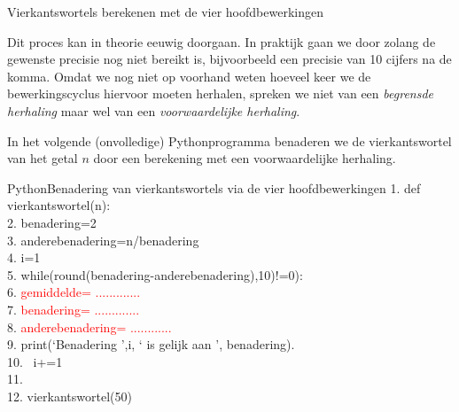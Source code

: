 \begin{lesactiviteit}{Vierkantswortels berekenen met de vier hoofdbewerkingen}
     \begin{vraagenantwoord}[resume]
    \end{vraagenantwoord}
    
    Dit proces kan in theorie eeuwig doorgaan. In praktijk gaan we door zolang de gewenste precisie nog niet bereikt is, bijvoorbeeld een precisie van 10 cijfers na de komma. Omdat we nog niet op voorhand weten hoeveel keer we de bewerkingscyclus hiervoor moeten herhalen, spreken we niet van een \emph{begrensde herhaling} maar wel van een \emph{voorwaardelijke herhaling}. 
    
    In het volgende (onvolledige) Pythonprogramma benaderen we de vierkantswortel van het getal $n$ door een berekening met een voorwaardelijke herhaling.\\
    
    \medskip
    
    \begin{kader}{Python}{Benadering van vierkantswortels via de vier hoofdbewerkingen}
    1. \qquad  def vierkantswortel(n):\\
    2. \qquad \qquad benadering=2\\
    3. \qquad \qquad anderebenadering=n/benadering\\
    4. \qquad \qquad i=1\\
    5. \qquad \qquad while(round(benadering-anderebenadering),10)!=0):\\
    6. \qquad \qquad \qquad \textcolor{red} {gemiddelde= .............}\\
    7. \qquad \qquad \qquad \textcolor{red} {benadering= .............}\\
    8. \qquad \qquad \qquad \textcolor{red} {anderebenadering= ............}\\
    9. \qquad \qquad \qquad print(`Benadering ',i, ` is gelijk aan ', benadering).\\
    10. \qquad \qquad \quad \, i+=1\\
    11. \\
    12. \quad vierkantswortel(50)\\
    \end{kader}
    

\end{lesactiviteit}
